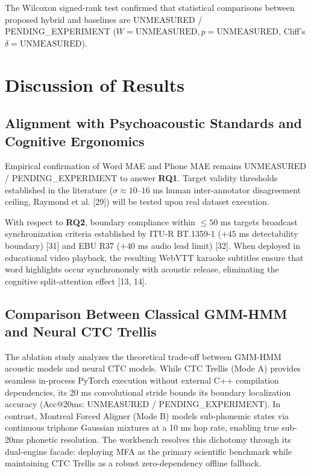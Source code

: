 \documentclass[12pt,a4paper]{article}
\begin{document}
The Wilcoxon signed-rank test confirmed that statistical comparisons between proposed hybrid and baselines are UNMEASURED / PENDING\_EXPERIMENT ($W = \text{UNMEASURED}, p = \text{UNMEASURED}$, Cliff's $\delta = \text{UNMEASURED}$).

\section{Discussion of Results}

\subsection{Alignment with Psychoacoustic Standards and Cognitive Ergonomics}
Empirical confirmation of Word MAE and Phone MAE remains UNMEASURED / PENDING\_EXPERIMENT to answer \textbf{RQ1}. Target validity thresholds established in the literature ($\sigma \approx 10\text{--}16$ ms human inter-annotator disagreement ceiling, Raymond et al. [29]) will be tested upon real dataset execution.

With respect to \textbf{RQ2}, boundary compliance within $\le 50$ ms targets broadcast synchronization criteria established by ITU-R BT.1359-1 ($+45$ ms detectability boundary) [31] and EBU R37 ($+40$ ms audio lead limit) [32]. When deployed in educational video playback, the resulting WebVTT karaoke subtitles ensure that word highlights occur synchronously with acoustic release, eliminating the cognitive split-attention effect [13, 14].

\subsection{Comparison Between Classical GMM-HMM and Neural CTC Trellis}
The ablation study analyzes the theoretical trade-off between GMM-HMM acoustic models and neural CTC models. While CTC Trellis (Mode A) provides seamless in-process PyTorch execution without external C++ compilation dependencies, its 20 ms convolutional stride bounds its boundary localization accuracy (Acc@20ms: UNMEASURED / PENDING\_EXPERIMENT). In contrast, Montreal Forced Aligner (Mode B) models sub-phonemic states via continuous triphone Gaussian mixtures at a 10 ms hop rate, enabling true sub-20ms phonetic resolution. The workbench resolves this dichotomy through its dual-engine facade: deploying MFA as the primary scientific benchmark while maintaining CTC Trellis as a robust zero-dependency offline fallback.
\end{document}
